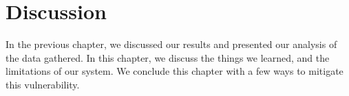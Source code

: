\section{Discussion}
    In the previous chapter, we discussed our results and presented our analysis of the data gathered. In this chapter, we discuss the things we learned, and the limitations of our system. We conclude this chapter with a few ways to mitigate this vulnerability.


